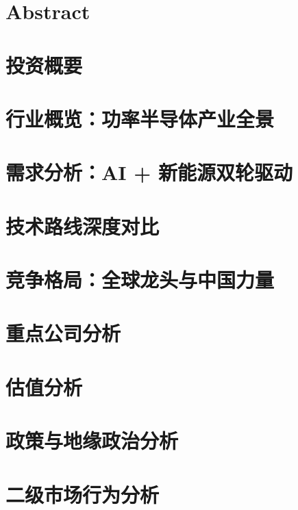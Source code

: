 \documentclass[a4paper,11pt,openany,fontset=none]{ctexrep}
\begin{document}
\astockcover

\tableofcontents
\clearpage

\chapter*{Abstract}

\clearpage

\chapter{投资概要}


\chapter{行业概览：功率半导体产业全景}


\chapter{需求分析：AI + 新能源双轮驱动}


\chapter{技术路线深度对比}


\chapter{竞争格局：全球龙头与中国力量}


\chapter{重点公司分析}


\chapter{估值分析}


\chapter{政策与地缘政治分析}


\chapter{二级市场行为分析}

\end{document}
